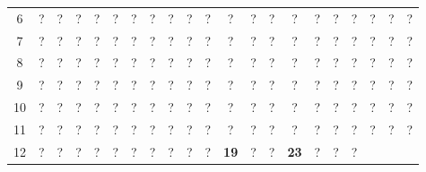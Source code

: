 \begin{figure}[H]
\begin{center}
{\begin{tabular}{|c|*{20}{c|}}
        6             & ?              & ?            & ?             & ?
        & ?              & ?            & ?             & ?           &
        ?             & ?              & ?            & ?             & ?
        & ?              & ?            & ?             & ?
        & ?              & ?            & ?                             \\
        7             & ?              & ?            & ?             & ?
        & ?              & ?            & ?             & ?           &
        ?             & ?              & ?            & ?             & ?
        & ?              & ?            & ?             & ?
        & ?              & ?            & ?                             \\
        8             & ?              & ?            & ?             & ?
        & ?              & ?            & ?             & ?           &
        ?             & ?              & ?            & ?             & ?
        & ?              & ?            & ?             & ?
        & ?              & ?            & ?                             \\
        9             & ?              & ?            & ?             & ?
        & ?              & ?            & ?             & ?           &
        ?             & ?              & ?            & ?             & ?
        & ?              & ?            & ?             & ?
        & ?              & ?            & ?                             \\
        10            & ?              & ?            & ?             & ?
        & ?              & ?            & ?             & ?           &
        ?             & ?              & ?            & ?             & ?
        & ?              & ?            & ?             & ?
        & ?              & ?            & ?                             \\
        11            & ?              & ?            & ?             & ?
        & ?              & ?            & ?             & ?           &
        ?             & ?              & ?            & ?             & ?
        & ?              & ?            & ?             & ?
        & ?              & ?            & ?                             \\
        12            & ?              & ?            & ?             & ?
        & ?              & ?            & ?             & ?           &
        ?             & ?              & {\bf{19}}    & ?             & ?
        & {\bf{23}}      & ?            & ?             & ?

\end{tabular}}
\end{center}
\end{figure}

